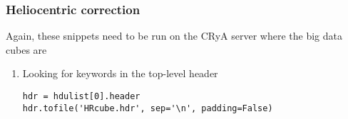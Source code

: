 \documentclass[11pt]{article}
\begin{document}
\subsubsection{}
\label{sec:orgheadline49}
\subsubsection{Heliocentric correction}
\label{sec:orgheadline51}
Again, these snippets need to be run on the CRyA server where the big data cubes are
\begin{enumerate}
\item Looking for keywords in the top-level header
\label{sec:orgheadline50}
\begin{verbatim}
hdr = hdulist[0].header
hdr.tofile('HRcube.hdr', sep='\n', padding=False)
\end{verbatim}


\end{enumerate}
\end{document}
